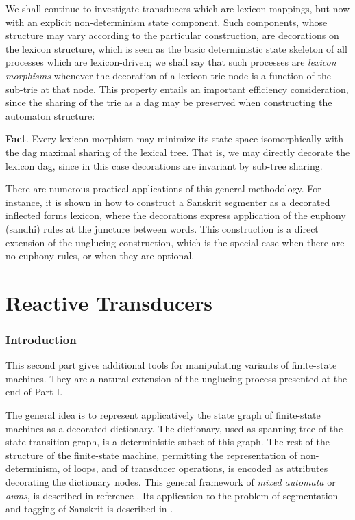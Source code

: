 \documentclass[12pt]{article}
\begin{document}
We shall continue to investigate transducers which are lexicon mappings,
but now with an explicit non-determinism state component. Such components,
whose structure may vary according to the particular construction, are
decorations on the lexicon structure, which is seen as the basic
deterministic state skeleton of all processes which are
lexicon-driven; we shall say that such processes are
{\sl lexicon morphisms} whenever the decoration of a lexicon trie node is a 
function of the sub-trie at that node. 
This property entails an important
efficiency consideration, since the sharing of the trie as a dag may be 
preserved when constructing the automaton structure:

\noindent
{\bf Fact}. Every lexicon morphism may minimize its state space isomorphically
with the dag maximal sharing of the lexical tree. That is, we may directly 
decorate the lexicon dag, since in this case
decorations are invariant by sub-tree sharing.

There are numerous practical applications of this general methodology.
For instance, it is shown in \cite{2004-Huet-1} how to construct 
a Sanskrit segmenter as a
decorated inflected forms lexicon, where the decorations express application
of the euphony (sandhi) rules at the juncture between words. 
This construction is a
direct extension of the unglueing construction, which is the special case
when there are no euphony rules, or when they are optional. 

\part{Reactive Transducers}

\section{Introduction}

This second part gives additional tools for manipulating variants of finite-state machines.
They are a natural extension of the unglueing process presented at the end of Part I.

The general idea is to represent applicatively the state graph of finite-state machines
as a decorated dictionary. The dictionary, used as spanning tree of the state transition graph,
is a deterministic subset of this graph. The rest of the structure of the finite-state machine,
permitting the representation of non-determinism, of loops, and of transducer operations,
is encoded as attributes decorating the dictionary nodes. This general framework
of {\sl mixed automata} or {\sl aums}, is described in reference \cite{2003-Huet-3}. 
Its application to the problem of segmentation and tagging of Sanskrit is described
in \cite{2004-Huet-1}. 
\end{document}
